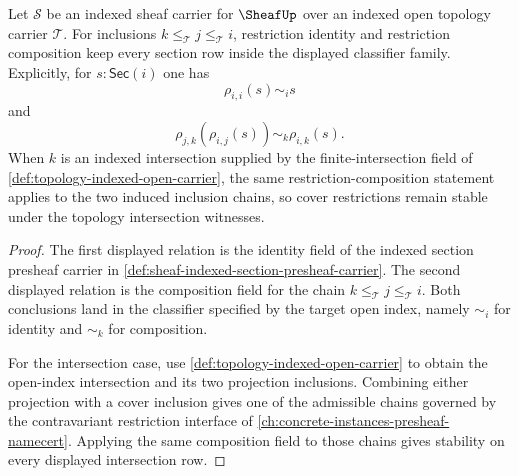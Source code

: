 \begin{theorem}
\label{thm:sheaf-restriction-stability-obligation}
Let $\mathcal{S}$ be an indexed sheaf carrier for $\SheafUp$ over an indexed open topology carrier $\mathcal{T}$. For inclusions $k\le_{\mathcal{T}}j\le_{\mathcal{T}}i$, restriction identity and restriction composition keep every section row inside the displayed classifier family. Explicitly, for $s:\mathsf{Sec}(i)$ one has
$$
\rho_{i,i}(s)\sim_i s
$$
and
$$
\rho_{j,k}(\rho_{i,j}(s))\sim_k\rho_{i,k}(s).
$$
When $k$ is an indexed intersection supplied by the finite-intersection field of \autoref{def:topology-indexed-open-carrier}, the same restriction-composition statement applies to the two induced inclusion chains, so cover restrictions remain stable under the topology intersection witnesses.
\end{theorem}
\begin{proof}
The first displayed relation is the identity field of the indexed section presheaf carrier in \autoref{def:sheaf-indexed-section-presheaf-carrier}. The second displayed relation is the composition field for the chain $k\le_{\mathcal{T}}j\le_{\mathcal{T}}i$. Both conclusions land in the classifier specified by the target open index, namely $\sim_i$ for identity and $\sim_k$ for composition.

For the intersection case, use \autoref{def:topology-indexed-open-carrier} to obtain the open-index intersection and its two projection inclusions. Combining either projection with a cover inclusion gives one of the admissible chains governed by the contravariant restriction interface of \autoref{ch:concrete-instances-presheaf-namecert}. Applying the same composition field to those chains gives stability on every displayed intersection row.
\end{proof}

